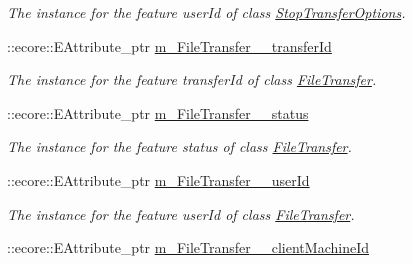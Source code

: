 \begin{DoxyCompactItemize}
\begin{DoxyCompactList}\small\item\em The instance for the feature userId of class \hyperlink{classFMS__Data_1_1StopTransferOptions}{StopTransferOptions}. \item\end{DoxyCompactList}\item 
\hypertarget{classFMS__Data_1_1FMS__DataPackage_a91ecab99a83d3d97d8c9777e1f8c7b88}{
::ecore::EAttribute\_\-ptr \hyperlink{classFMS__Data_1_1FMS__DataPackage_a91ecab99a83d3d97d8c9777e1f8c7b88}{m\_\-FileTransfer\_\-\_\-transferId}}
\label{classFMS__Data_1_1FMS__DataPackage_a91ecab99a83d3d97d8c9777e1f8c7b88}

\begin{DoxyCompactList}\small\item\em The instance for the feature transferId of class \hyperlink{classFMS__Data_1_1FileTransfer}{FileTransfer}. \item\end{DoxyCompactList}\item 
\hypertarget{classFMS__Data_1_1FMS__DataPackage_acd3ff2f3a960554668da5c534a902292}{
::ecore::EAttribute\_\-ptr \hyperlink{classFMS__Data_1_1FMS__DataPackage_acd3ff2f3a960554668da5c534a902292}{m\_\-FileTransfer\_\-\_\-status}}
\label{classFMS__Data_1_1FMS__DataPackage_acd3ff2f3a960554668da5c534a902292}

\begin{DoxyCompactList}\small\item\em The instance for the feature status of class \hyperlink{classFMS__Data_1_1FileTransfer}{FileTransfer}. \item\end{DoxyCompactList}\item 
\hypertarget{classFMS__Data_1_1FMS__DataPackage_aef7f7023f78410d30b17d998f02aa2d6}{
::ecore::EAttribute\_\-ptr \hyperlink{classFMS__Data_1_1FMS__DataPackage_aef7f7023f78410d30b17d998f02aa2d6}{m\_\-FileTransfer\_\-\_\-userId}}
\label{classFMS__Data_1_1FMS__DataPackage_aef7f7023f78410d30b17d998f02aa2d6}

\begin{DoxyCompactList}\small\item\em The instance for the feature userId of class \hyperlink{classFMS__Data_1_1FileTransfer}{FileTransfer}. \item\end{DoxyCompactList}\item 
\hypertarget{classFMS__Data_1_1FMS__DataPackage_a788f1e7175a92c875b5bdaf95040fd3e}{
::ecore::EAttribute\_\-ptr \hyperlink{classFMS__Data_1_1FMS__DataPackage_a788f1e7175a92c875b5bdaf95040fd3e}{m\_\-FileTransfer\_\-\_\-clientMachineId}}
\label{classFMS__Data_1_1FMS__DataPackage_a788f1e7175a92c875b5bdaf95040fd3e}


\end{DoxyCompactItemize}

